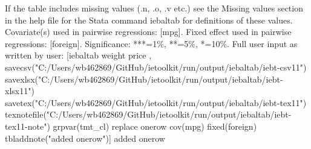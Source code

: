 If the table includes missing values (.n, .o, .v etc.) see the Missing values section in the help file for the Stata command iebaltab for definitions of these values. Covariate(s) used in pairwise regressions: [mpg]. Fixed effect used in pairwise regressions: [foreign]. Significance: ***=1\%, **=5\%, *=10\%. Full user input as written by user: [iebaltab weight price , savecsv("C:/Users/wb462869/GitHub/ietoolkit/run/output/iebaltab/iebt-csv11") savexlsx("C:/Users/wb462869/GitHub/ietoolkit/run/output/iebaltab/iebt-xlsx11") savetex("C:/Users/wb462869/GitHub/ietoolkit/run/output/iebaltab/iebt-tex11") texnotefile("C:/Users/wb462869/GitHub/ietoolkit/run/output/iebaltab/iebt-tex11-note") grpvar(tmt\_cl) replace onerow cov(mpg) fixed(foreign) tbladdnote("added onerow")] added onerow
